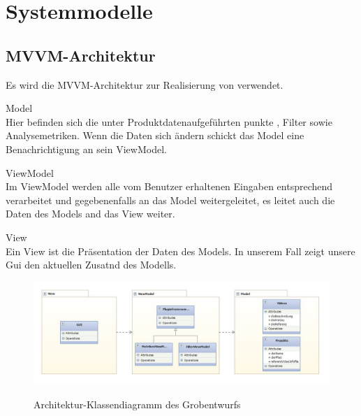 \chapter{Systemmodelle}

\section{MVVM-Architektur}
\setcounter{counterKriterien}{0}

Es wird die MVVM-Architektur zur Realisierung von \projektTitel verwendet.

 Model \\
Hier befinden sich die unter Produktdatenaufgeführten punkte , Filter sowie Analysemetriken. Wenn die Daten
sich ändern schickt das Model eine Benachrichtigung an sein ViewModel.

 ViewModel \\
Im ViewModel werden alle vom Benutzer erhaltenen Eingaben entsprechend verarbeitet und
gegebenenfalls an das Model weitergeleitet, es leitet auch die Daten des Models and das View weiter.

 View \\
Ein View ist die Präsentation der Daten des Models. In unserem Fall zeigt unsere Gui den aktuellen Zusatnd des Modells.

\begin{figure}[h]
\includegraphics[width=1\linewidth]{bilder/Grobentwurf.jpg}
\label{Architektur_Grobentwurf}
\caption{Architektur-Klassendiagramm des Grobentwurfs}
\end{figure}




